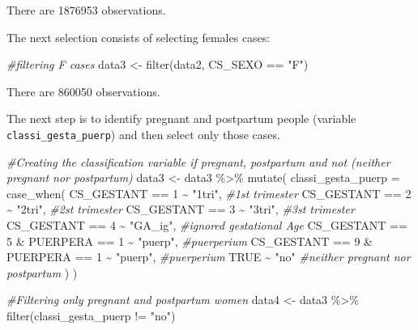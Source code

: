 \documentclass[
]{article}
\newenvironment{Shaded}{\begin{snugshade}}{\end{snugshade}}
\newcommand{\AttributeTok}[1]{\textcolor[rgb]{0.77,0.63,0.00}{#1}}
\newcommand{\CommentTok}[1]{\textcolor[rgb]{0.56,0.35,0.01}{\textit{#1}}}
\newcommand{\ConstantTok}[1]{\textcolor[rgb]{0.00,0.00,0.00}{#1}}
\newcommand{\DecValTok}[1]{\textcolor[rgb]{0.00,0.00,0.81}{#1}}
\newcommand{\FunctionTok}[1]{\textcolor[rgb]{0.00,0.00,0.00}{#1}}
\newcommand{\NormalTok}[1]{#1}
\newcommand{\OtherTok}[1]{\textcolor[rgb]{0.56,0.35,0.01}{#1}}
\newcommand{\SpecialCharTok}[1]{\textcolor[rgb]{0.00,0.00,0.00}{#1}}
\newcommand{\StringTok}[1]{\textcolor[rgb]{0.31,0.60,0.02}{#1}}
\begin{document}
There are 1876953 observations.

The next selection consists of selecting females cases:

\begin{Shaded}
\begin{Highlighting}[]
\CommentTok{\#filtering F cases}
\NormalTok{data3 }\OtherTok{\textless{}{-}} \FunctionTok{filter}\NormalTok{(data2, CS\_SEXO }\SpecialCharTok{==} \StringTok{"F"}\NormalTok{)}
\end{Highlighting}
\end{Shaded}

There are 860050 observations.

The next step is to identify pregnant and postpartum people (variable
\texttt{classi\_gesta\_puerp}) and then select only those cases.

\begin{Shaded}
\begin{Highlighting}[]
\CommentTok{\#Creating the classification variable if pregnant, postpartum and not (neither pregnant nor postpartum)}
\NormalTok{data3 }\OtherTok{\textless{}{-}}\NormalTok{ data3 }\SpecialCharTok{\%\textgreater{}\%}
  \FunctionTok{mutate}\NormalTok{(}
    \AttributeTok{classi\_gesta\_puerp =} \FunctionTok{case\_when}\NormalTok{(}
\NormalTok{      CS\_GESTANT }\SpecialCharTok{==} \DecValTok{1}  \SpecialCharTok{\textasciitilde{}} \StringTok{"1tri"}\NormalTok{, }\CommentTok{\#1st trimester}
\NormalTok{      CS\_GESTANT }\SpecialCharTok{==} \DecValTok{2}  \SpecialCharTok{\textasciitilde{}} \StringTok{"2tri"}\NormalTok{, }\CommentTok{\#2st trimester}
\NormalTok{      CS\_GESTANT }\SpecialCharTok{==} \DecValTok{3}  \SpecialCharTok{\textasciitilde{}} \StringTok{"3tri"}\NormalTok{, }\CommentTok{\#3st trimester}
\NormalTok{      CS\_GESTANT }\SpecialCharTok{==} \DecValTok{4}  \SpecialCharTok{\textasciitilde{}} \StringTok{"GA\_ig"}\NormalTok{, }\CommentTok{\#ignored gestational Age}
\NormalTok{      CS\_GESTANT }\SpecialCharTok{==} \DecValTok{5} \SpecialCharTok{\&}
\NormalTok{        PUERPERA }\SpecialCharTok{==} \DecValTok{1} \SpecialCharTok{\textasciitilde{}} \StringTok{"puerp"}\NormalTok{, }\CommentTok{\#puerperium}
\NormalTok{      CS\_GESTANT }\SpecialCharTok{==} \DecValTok{9} \SpecialCharTok{\&}\NormalTok{ PUERPERA }\SpecialCharTok{==} \DecValTok{1} \SpecialCharTok{\textasciitilde{}} \StringTok{"puerp"}\NormalTok{,  }\CommentTok{\#puerperium}
      \ConstantTok{TRUE} \SpecialCharTok{\textasciitilde{}} \StringTok{"no"} \CommentTok{\#neither pregnant nor postpartum }
\NormalTok{    )}
\NormalTok{  )}

\CommentTok{\#Filtering only pregnant and postpartum women}
\NormalTok{data4 }\OtherTok{\textless{}{-}}\NormalTok{ data3 }\SpecialCharTok{\%\textgreater{}\%}
  \FunctionTok{filter}\NormalTok{(classi\_gesta\_puerp }\SpecialCharTok{!=} \StringTok{"no"}\NormalTok{)}
\end{Highlighting}
\end{Shaded}
\end{document}
